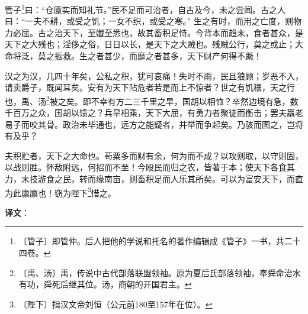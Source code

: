 \documentclass[12pt,UTF-8,openany]{ctexbook}
\begin{document}
\begin{normalsize}
    
    管子\footnote{〔管子〕即管仲。后人把他的学说和托名的著作编辑成《管子》一书，共二十四卷。}曰：“仓廪实而知礼节。”民不足而可治者，自古及今，未之尝闻。古之人曰：“一夫不耕，或受之饥；一女不织，或受之寒。” 生之有时，而用之亡度，则物力必屈。古之治天下，至孅至悉也，故其畜积足恃。今背本而趋末，食者甚众，是天下之大残也；淫侈之俗，日日以长，是天下之大贼也。残贼公行，莫之或止；大命将泛，莫之振救。生之者甚少，而靡之者甚多，天下财产何得不蹶！
    
    汉之为汉，几四十年矣，公私之积，犹可哀痛！失时不雨，民且狼顾；岁恶不入，请卖爵子，既闻耳矣。安有为天下阽危者若是而上不惊者？世之有饥穰，天之行也，禹、汤\footnote{〔禹、汤〕禹，传说中古代部落联盟领袖。原为夏后氏部落领袖，奉舜命治水有功，舜死后继其位。汤，商朝的开国君主。}被之矣。即不幸有方二三千里之旱，国胡以相恤？卒然边境有急，数千百万之众，国胡以馈之？兵旱相乘，天下大屈，有勇力者聚徒而衡击；罢夫羸老易子而咬其骨。政治未毕通也，远方之能疑者，并举而争起矣。乃骇而图之，岂将有及乎？
    
    夫积贮者，天下之大命也。苟粟多而财有余，何为而不成？以攻则取，以守则固，以战则胜。怀敌附远，何招而不至！今殴民而归之农，皆著于本；使天下各食其力，末技游食之民，转而缘南亩，则畜积足而人乐其所矣。可以为富安天下，而直为此廪廪也！窃为陛下\footnote{〔陛下〕指汉文帝刘恒（公元前180至157年在位）。}惜之。
\end{normalsize}


\newpage

\textbf{译文}：

\vspace{1em}
\end{document}
